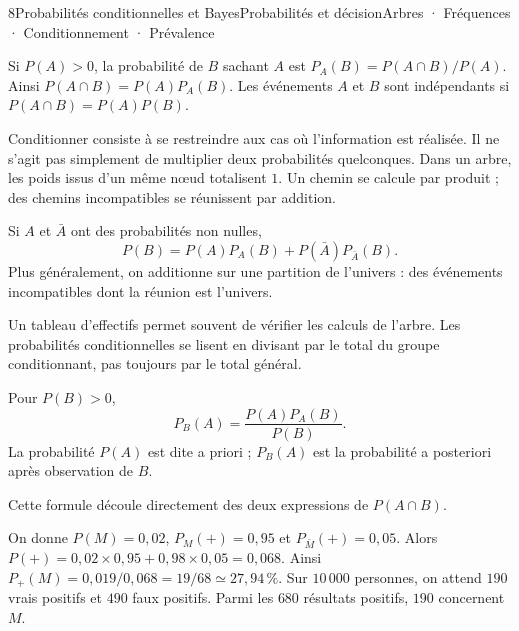 \begin{ouverture}[conditionnelles]{8}{Probabilités conditionnelles et Bayes}{Probabilités et décision}{Arbres · Fréquences · Conditionnement · Prévalence}
\end{ouverture}
\essentiel

\begin{definition}
Si $P(A)>0$, la probabilité de $B$ sachant $A$ est $P_A(B)=P(A\cap B)/P(A)$.
Ainsi $P(A\cap B)=P(A)P_A(B)$.
Les événements $A$ et $B$ sont indépendants si $P(A\cap B)=P(A)P(B)$.
\end{definition}
Conditionner consiste à se restreindre aux cas où l'information est réalisée. Il ne s'agit pas simplement de multiplier deux probabilités quelconques.
Dans un arbre, les poids issus d'un même nœud totalisent $1$. Un chemin se calcule par produit ; des chemins incompatibles se réunissent par addition.
\begin{propriete}
Si $A$ et $\bar A$ ont des probabilités non nulles,
\[P(B)=P(A)P_A(B)+P(\bar A)P_{\bar A}(B).\]
Plus généralement, on additionne sur une partition de l'univers : des événements incompatibles dont la réunion est l'univers.
\end{propriete}
Un tableau d'effectifs permet souvent de vérifier les calculs de l'arbre. Les probabilités conditionnelles se lisent en divisant par le total du groupe conditionnant, pas toujours par le total général.
\begin{theoreme}
Pour $P(B)>0$,
\[P_B(A)=\frac{P(A)P_A(B)}{P(B)}.
\]
La probabilité $P(A)$ est dite a priori ; $P_B(A)$ est la probabilité a posteriori après observation de $B$.
\end{theoreme}
Cette formule découle directement des deux expressions de $P(A\cap B)$.
\begin{exemple}
On donne $P(M)=0{,}02$, $P_M(+)=0{,}95$ et $P_{\bar M}(+)=0{,}05$.
Alors $P(+)=0{,}02\times0{,}95+0{,}98\times0{,}05=0{,}068$.
Ainsi $P_+(M)=0{,}019/0{,}068=19/68\simeq27{,}94\,\%$.
Sur $10\,000$ personnes, on attend $190$ vrais positifs et $490$ faux positifs. Parmi les $680$ résultats positifs, $190$ concernent $M$.
\end{exemple}
